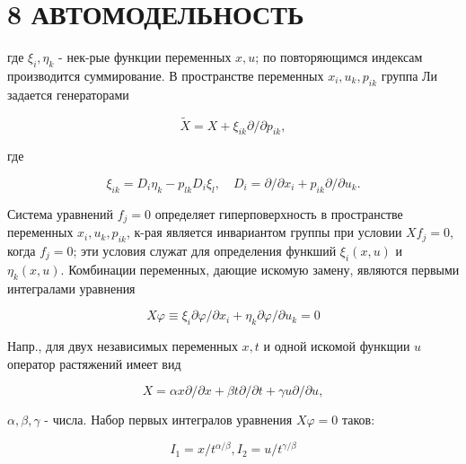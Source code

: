 \documentclass[10pt]{article}
\begin{document}
\section{8 АВТОМОДЕЛЬНОСТЬ}

где $\xi_{i}, \eta_{k}$ - нек-рые функции переменных $x, u$; по повторяющимся индексам производится суммирование. В пространстве переменных $x_{i}, u_{k}, p_{i k}$ группа Ли задается генераторами



\[

\tilde{X}=X+\xi_{i k} \partial / \partial p_{i k},

\]



где



\[

\xi_{i k}=D_{i} \eta_{k}-p_{l k} D_{i} \xi_{l}, \quad D_{i}=\partial / \partial x_{i}+p_{i k} \partial / \partial u_{k} .

\]



Система уравнений $f_{j}=0$ определяет гиперповерхность в пространстве переменных $x_{i}, u_{k}, p_{i k}$, к-рая является инвариантом группы при условии $X f_{j}=0$, когда $f_{j}=0$; эти условия служат для определения функший $\xi_{i}(x, u)$ и $\eta_{k}(x, u)$. Комбинации переменных, дающие искомую замену, являются первыми интегралами уравнения



\[

X \varphi \equiv \xi_{i} \partial \varphi / \partial x_{i}+\eta_{k} \partial \varphi / \partial u_{k}=0

\]



Напр., для двух независимых переменных $x, t$ и одной искомой функщии $u$ оператор растяжений имеет вид



\[

X=\alpha x \partial / \partial x+\beta t \partial / \partial t+\gamma u \partial / \partial u,

\]



$\alpha, \beta, \gamma$ - числа. Набор первых интегралов уравнения $X \varphi=0$ таков:



\[

I_{1}=x / t^{\alpha / \beta}, I_{2}=u / t^{\gamma / \beta}

\]
\end{document}
